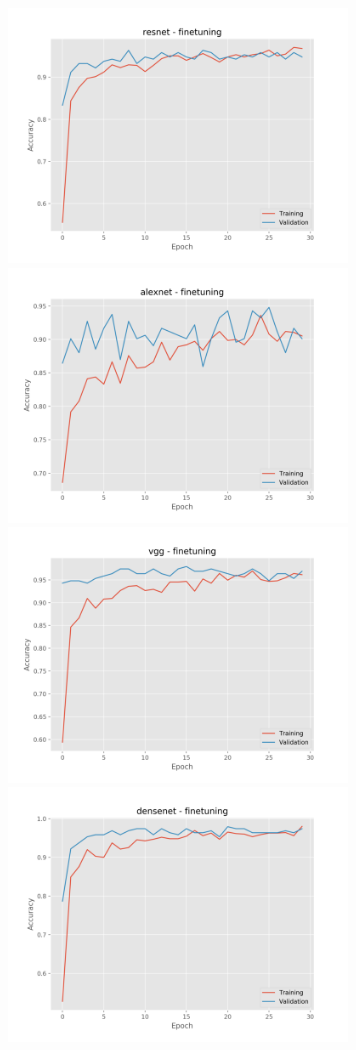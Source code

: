\documentclass[]{kththesis}
\begin{document}
  \begin{figure}[h]
    \includegraphics[width=9cm]{r_a_resnet_fine}
    \includegraphics[width=9cm]{r_a_alexnet_fine}
    \includegraphics[width=9cm]{r_a_vgg_fine}
    \includegraphics[width=9cm]{r_a_densenet_fine}

\end{figure}
\end{document}
